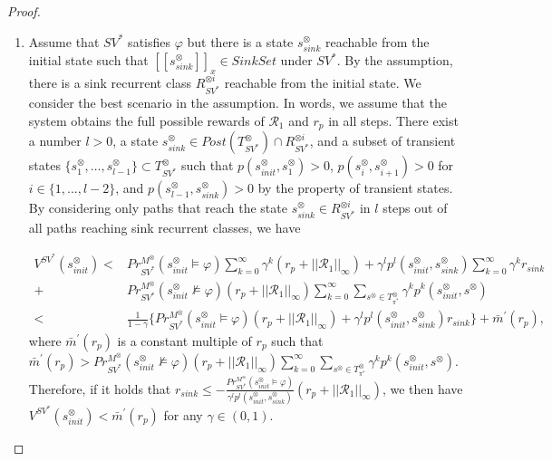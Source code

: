 \documentclass[10pt]{article}
\theoremstyle{definition}
\newcommand{\myspqsink}{\ensuremath{[\![s^{\otimes}_{sink}]\!]}_x}
\begin{document}
\begin{proof}
\begin{enumerate}
  \item Assume that $SV^{\ast}$ satisfies $\varphi$ but there is a state $s^{\otimes}_{sink}$ reachable from the initial state such that $\myspqsink \in SinkSet$ under $SV^{\ast}$. By the assumption, there is a sink recurrent class $R^{\otimes i}_{SV^{\ast}}$ reachable from the initial state. We consider the best scenario in the assumption. In words, we assume that the system obtains the full possible rewards of $\mathcal{R}_1$ and $r_p$ in all steps. There exist a number $l > 0$, a state $s^{\otimes}_{sink} \in Post(T^{\otimes}_{SV^{\ast}}) \cap R^{\otimes i}_{SV^{\ast}}$, and a subset of transient states $\{ s^{\otimes}_1, \ldots , s^{\otimes}_{l-1} \} \subset T^{\otimes}_{SV^{\ast}}$ such that $p(s^{\otimes}_{init}, s^{\otimes}_1)>0$, $p(s^{\otimes}_{i}, s^{\otimes}_{i+1})>0$ for $i \in \{ 1,...,l-2 \}$, and $p(s^{\otimes}_{l-1}, s^{\otimes}_{sink})>0$ by the property of transient states. By considering only paths that reach the state $s^{\otimes}_{sink} \in R^{\otimes i}_{SV^{\ast}}$ in $l$ steps out of all paths reaching sink recurrent classes, we have

  \begin{align}
    V^{SV^{\ast}}(s^{\otimes}_{init}) < & Pr^{M^{\otimes}}_{SV^{\ast}}(s^{\otimes}_{init} \models \varphi) \sum_{k=0}^{\infty} \gamma^k (r_p + ||\mathcal{R}_1||_{\infty}) + \gamma^l p^l(s^{\otimes}_{init}, s^{\otimes}_{sink}) \sum_{k=0}^{\infty} \gamma^k r_{sink} \nonumber \\
    + & Pr^{M^{\otimes}}_{SV^{\ast}}(s^{\otimes}_{init} \not\models \varphi) (r_p + ||\mathcal{R}_1||_{\infty}) \sum_{k=0}^{\infty} \sum_{s^{\otimes} \in T^{\otimes}_{\pi^{\ast}}} \gamma^k p^k(s^{\otimes}_{init}, s^{\otimes}) \nonumber \\
    < & \frac{1}{1-\gamma} \{ Pr^{M^{\otimes}}_{SV^{\ast}}(s^{\otimes}_{init} \models \varphi) (r_p + ||\mathcal{R}_1||_{\infty}) + \gamma^l p^l (s^{\otimes}_{init}, s^{\otimes}_{sink}) r_{sink} \} + \bar{m}^{\prime}(r_p), \nonumber
  \end{align}
  where $\bar{m}^{\prime}(r_p)$ is a constant multiple of $r_p$ such that $\bar{m}^{\prime}(r_p) > Pr^{M^{\otimes}}_{SV^{\ast}}(s^{\otimes}_{init} \not\models \varphi) (r_p + ||\mathcal{R}_1||_{\infty}) \sum_{k=0}^{\infty} \sum_{s^{\otimes} \in T^{\otimes}_{\pi^{\ast}}} \gamma^k p^k(s^{\otimes}_{init}, s^{\otimes})$.
  Therefore, if it holds that $r_{sink} \leq - \frac{Pr^{M^{\otimes}}_{SV^{\ast}}(s^{\otimes}_{init} \models \varphi)}{ \gamma^l p^l (s^{\otimes}_{init}, s^{\otimes}_{sink})} (r_p + ||\mathcal{R}_1||_{\infty})$, we then have $V^{SV^{\ast}}(s^{\otimes}_{init}) < \bar{m}^{\prime}(r_p)$ for any $\gamma \in (0,1)$.


\end{enumerate}
\end{proof}
\end{document}
